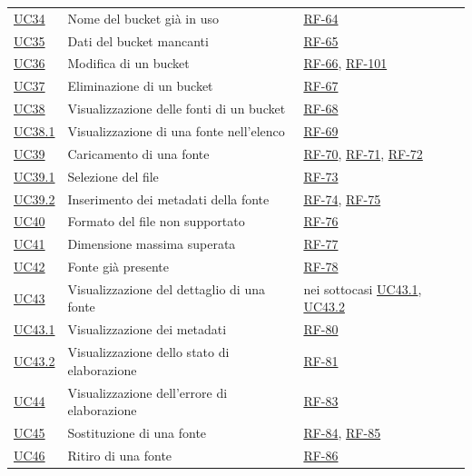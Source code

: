 \documentclass[documento]{gpt}
\begin{document}
{\begin{longtable}{@{}p{1.4cm}>{\raggedright\arraybackslash}p{9.2cm}>{\raggedright\arraybackslash}p{4.2cm}@{}}
\hyperref[uc:bk_nome_dup]{UC34} & Nome del bucket già in uso & \hyperlink{req:RF-64}{RF-64} \\
\hyperref[uc:bk_incompleto]{UC35} & Dati del bucket mancanti & \hyperlink{req:RF-65}{RF-65} \\
\hyperref[uc:bk_modifica]{UC36} & Modifica di un bucket & \hyperlink{req:RF-66}{RF-66}, \hyperlink{req:RF-101}{RF-101} \\
\hyperref[uc:bk_elimina]{UC37} & Eliminazione di un bucket & \hyperlink{req:RF-67}{RF-67} \\
\hyperref[uc:fn_elenco]{UC38} & Visualizzazione delle fonti di un bucket & \hyperlink{req:RF-68}{RF-68} \\
\hyperref[uc:fn_elem]{UC38.1} & Visualizzazione di una fonte nell'elenco & \hyperlink{req:RF-69}{RF-69} \\
\hyperref[uc:fn_carica]{UC39} & Caricamento di una fonte & \hyperlink{req:RF-70}{RF-70}, \hyperlink{req:RF-71}{RF-71}, \hyperlink{req:RF-72}{RF-72} \\
\hyperref[uc:fn_file]{UC39.1} & Selezione del file & \hyperlink{req:RF-73}{RF-73} \\
\hyperref[uc:fn_meta]{UC39.2} & Inserimento dei metadati della fonte & \hyperlink{req:RF-74}{RF-74}, \hyperlink{req:RF-75}{RF-75} \\
\hyperref[uc:fn_formato]{UC40} & Formato del file non supportato & \hyperlink{req:RF-76}{RF-76} \\
\hyperref[uc:fn_dim]{UC41} & Dimensione massima superata & \hyperlink{req:RF-77}{RF-77} \\
\hyperref[uc:fn_dup]{UC42} & Fonte già presente & \hyperlink{req:RF-78}{RF-78} \\
\hyperref[uc:fn_dettaglio]{UC43} & Visualizzazione del dettaglio di una fonte & nei sottocasi \hyperref[uc:fn_meta_v]{UC43.1}, \hyperref[uc:fn_stato]{UC43.2} \\
\hyperref[uc:fn_meta_v]{UC43.1} & Visualizzazione dei metadati & \hyperlink{req:RF-80}{RF-80} \\
\hyperref[uc:fn_stato]{UC43.2} & Visualizzazione dello stato di elaborazione & \hyperlink{req:RF-81}{RF-81} \\
\hyperref[uc:fn_errore]{UC44} & Visualizzazione dell'errore di elaborazione & \hyperlink{req:RF-83}{RF-83} \\
\hyperref[uc:fn_sostituisci]{UC45} & Sostituzione di una fonte & \hyperlink{req:RF-84}{RF-84}, \hyperlink{req:RF-85}{RF-85} \\
\hyperref[uc:fn_ritira]{UC46} & Ritiro di una fonte & \hyperlink{req:RF-86}{RF-86} \\

\end{longtable}}
\end{document}
